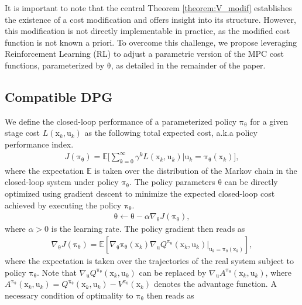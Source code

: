 \documentclass[10pt,twocolumn,twoside]{IEEEtran}
\newcommand{\vect}[1]{\ensuremath{\boldsymbol{\mathrm{#1}}}}
\begin{document}
It is important to note that the central Theorem \ref{theorem:V_modif} establishes the existence of a cost modification and offers insight into its structure. However, this modification is not directly implementable in practice, as the modified cost function is not known a priori. To overcome this challenge, we propose leveraging Reinforcement Learning (RL) to adjust a parametric version of the MPC cost functions, parameterized by $\vect\theta$, as detailed in the remainder of the paper.
\subsection{Compatible DPG}
We define the closed-loop performance of a parameterized policy $\vect\pi_{\vect\theta}$ for a given stage cost $L\left(\vect x_k,\vect u_k\right)$ as the following total expected cost, a.k.a policy performance index.
\begin{align}\label{eq:J}
J\left(\vect\pi_{\vect\theta}\right)=\mathbb{E}\Bigg[\sum_{k=0}^{\infty}\gamma^kL\left(\vect x_k,\vect u_k\right)\Bigg|\vect u_k=\vect \pi_{\vect\theta}(\vect x_k)\Bigg],
\end{align}
where the expectation $\mathbb{E}$ is taken over the distribution of the Markov chain in the closed-loop system under policy $\vect\pi_{\vect\theta}$. The policy parameters $\vect\theta$ can be directly optimized using gradient descent to minimize the expected closed-loop cost achieved by executing the policy $\vect\pi_{\vect\theta}$. 
\begin{align}
\label{eq:theta}
    \vect\theta \leftarrow \vect\theta-\alpha  \nabla _{\vect\theta}J(\vect\pi _{\vect\theta}),
\end{align}
where $\alpha>0$ is the learning rate. The policy gradient then reads as
\begin{align}\label{eq:PG_Q}
    \nabla_{\vect\theta} J\left(\vect\pi_{\vect\theta}\right)=\mathbb{E}\left[\nabla_{\vect\theta}\vect\pi_{\vect\theta}\left(\vect x_k\right)\nabla_{\vect u}Q^{\vect\pi_{\vect\theta}}\left(\vect x_k,\vect u_k\right)\Big|_{\vect u_k=\vect\pi_{\vect\theta}\left(\vect x_k\right)}\right],
\end{align}
where the expectation is taken over the trajectories of the real system subject to policy ${\vect{ \pi}_{\vect\theta}}$. Note that $\nabla_{\vect u}Q^{\vect\pi_{\vect\theta}}\left(\vect x_k,\vect u_k\right)$ can be replaced by $\nabla_{\vect u}A^{\vect\pi_{\vect\theta}}\left(\vect x_k,\vect u_k\right)$, where $A^{\vect\pi_{\vect\theta}}\left(\vect x_k,\vect u_k\right)=Q^{\vect\pi_{\vect\theta}}\left(\vect x_k,\vect u_k\right)-V^{\vect\pi_{\vect\theta}}\left(\vect x_k\right)$ denotes the advantage function. A necessary condition of optimality to $\vect\pi_{\vect\theta}$ then reads as
\end{document}
